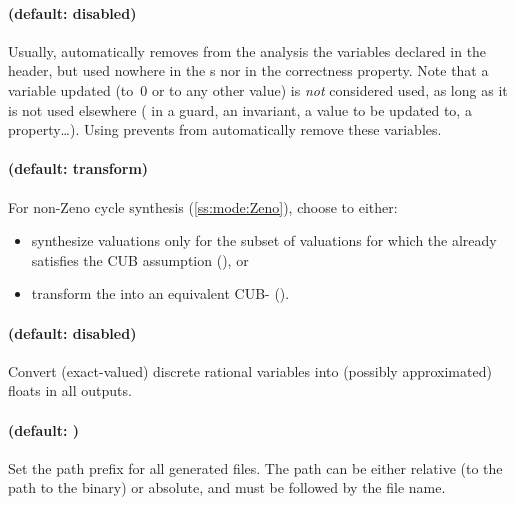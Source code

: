 \paragraph{ (default: disabled)}
Usually, \imitator{} automatically removes from the analysis the variables declared in the header, but used nowhere in the \IPTA{}s nor in the correctness property.
Note that a variable updated (to~0 or to any other value) is \emph{not} considered used, as long as it is not used elsewhere (\ie{} in a guard, an invariant, a value to be updated to, a property…).
Using  prevents \imitator{} from automatically remove these variables.


\paragraph{ (default: transform)}
For non-Zeno cycle synthesis (\cref{ss:mode:Zeno}), choose to either:
\begin{itemize}
	\item synthesize valuations only for the subset of valuations for which the \NIPTA{} already satisfies the CUB assumption (), or
	\item transform the \NIPTA{} into an equivalent CUB-\NIPTA{} ().
\end{itemize}



\paragraph{ (default: disabled)}
Convert (exact-valued) discrete rational variables into (possibly approximated) floats in all outputs.


\paragraph{ (default: )}
Set the path prefix for all generated files.
The path can be either relative (to the path to the \stylePath{\binimitator{}} binary) or absolute, and must be followed by the file name.


